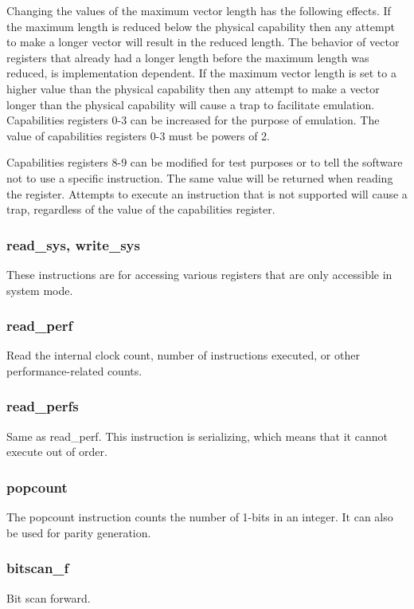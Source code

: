 \documentclass[forwardcom.tex]{subfiles}
\begin{document}
Changing the values of the maximum vector length has the following effects. If the maximum length is reduced below the physical capability then any attempt to make a longer vector will result in the reduced length. The behavior of vector registers that already had a longer length before the maximum length was reduced, is implementation dependent. If the maximum vector length is set to a higher value than the physical capability then any attempt to make a vector longer than the physical capability will cause a trap to facilitate emulation. Capabilities registers 0-3 can be increased for the purpose of emulation. The value of capabilities registers 0-3 must be powers of 2.
\vspace{2mm}

Capabilities registers 8-9 can be modified for test purposes or to tell the software not to use a specific instruction. The same value will be returned when reading the register. Attempts to execute an instruction that is not supported will cause a trap, regardless of the value of the capabilities register.

\subsubsection{read\_sys, write\_sys}
These instructions are for accessing various registers that are only accessible in system mode.

\subsubsection{read\_perf}
Read the internal clock count, number of instructions executed, or other performance-related counts.

\subsubsection{read\_perfs}
Same as read\_perf. This instruction is serializing, which means that it cannot execute out of order.

\subsubsection{popcount}
The popcount instruction counts the number of 1-bits in an integer. It can also be used for parity generation.

\subsubsection{bitscan\_f}
Bit scan forward. 
\vspace{2mm}
\end{document}
